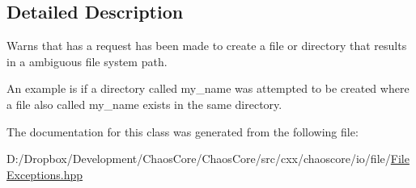 \subsection{Detailed Description}
Warns that has a request has been made to create a file or directory that results in a ambiguous file system path. 

An example is if a directory called \textquotesingle{}my\+\_\+name\textquotesingle{} was attempted to be created where a file also called \textquotesingle{}my\+\_\+name\textquotesingle{} exists in the same directory. 

The documentation for this class was generated from the following file\+:\begin{DoxyCompactItemize}
\item 
D\+:/\+Dropbox/\+Development/\+Chaos\+Core/\+Chaos\+Core/src/cxx/chaoscore/io/file/\hyperlink{_file_exceptions_8hpp}{File\+Exceptions.\+hpp}\end{DoxyCompactItemize}
